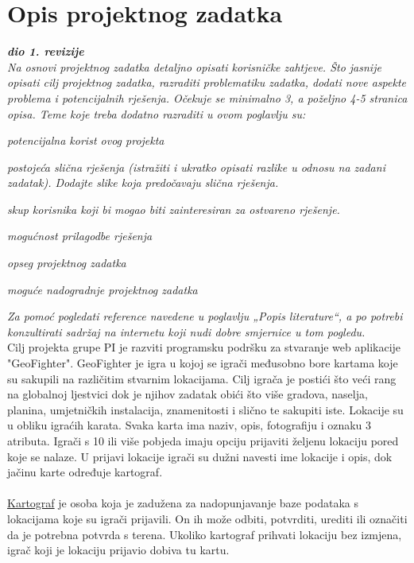 \chapter{Opis projektnog zadatka}
		
		\textbf{\textit{dio 1. revizije}}\\
		
		\textit{Na osnovi projektnog zadatka detaljno opisati korisničke zahtjeve. Što jasnije opisati cilj projektnog zadatka, razraditi problematiku zadatka, dodati nove aspekte problema i potencijalnih rješenja. Očekuje se minimalno 3, a poželjno 4-5 stranica opisa.	Teme koje treba dodatno razraditi u ovom poglavlju su:}
		\begin{packed_item}
			\item \textit{potencijalna korist ovog projekta}
			\item \textit{postojeća slična rješenja (istražiti i ukratko opisati razlike u odnosu na zadani zadatak). Dodajte slike koja predočavaju slična rješenja.}
			\item \textit{skup korisnika koji bi mogao biti zainteresiran za ostvareno rješenje.}
			\item \textit{mogućnost prilagodbe rješenja }
			\item \textit{opseg projektnog zadatka}
			\item \textit{moguće nadogradnje projektnog zadatka}
		\end{packed_item}
		
		\textit{Za pomoć pogledati reference navedene u poglavlju „Popis literature“, a po potrebi konzultirati sadržaj na internetu koji nudi dobre smjernice u tom pogledu.}\\
		
		\textnormal{Cilj projekta grupe PI je razviti programsku podršku za stvaranje web aplikacije "GeoFighter".  GeoFighter je igra u kojoj se igrači međusobno bore kartama koje su sakupili na različitim stvarnim lokacijama. Cilj igrača je postići što veći rang na globalnoj ljestvici dok je njihov zadatak obići što više  gradova, naselja, planina, umjetničkih instalacija, znamenitosti i slično te sakupiti iste. Lokacije su u obliku igraćih karata. Svaka karta ima naziv,  opis, fotografiju i oznaku 3 atributa. Igrači s 10 ili više pobjeda imaju opciju prijaviti željenu lokaciju pored koje se nalaze. U prijavi lokacije igrači su dužni navesti ime lokacije i opis, dok jačinu karte određuje kartograf. \\\\ \underline{Kartograf} je osoba koja je zadužena za nadopunjavanje baze podataka s lokacijama koje su igrači prijavili. On ih može odbiti, potvrditi, urediti ili označiti da je potrebna potvrda s terena. Ukoliko kartograf prihvati lokaciju bez izmjena, igrač koji je lokaciju  prijavio dobiva tu kartu.}\\
		
